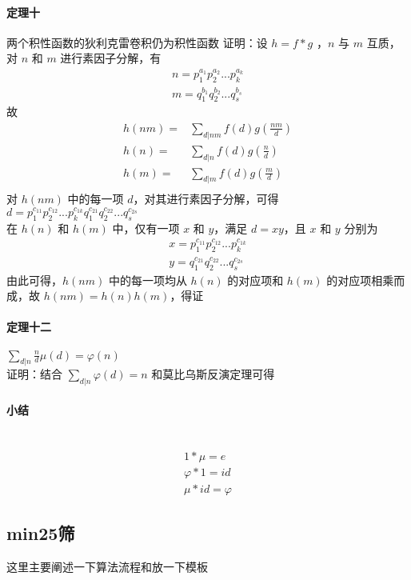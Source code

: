  	\paragraph{定理十}两个积性函数的狄利克雷卷积仍为积性函数
 	证明：设 $h = f * g$ ，$n$ 与 $m$ 互质，对 $n$ 和 $m$ 进行素因子分解，有
 	$$
 	\begin{aligned}
 	 	 n=p_1^{a_1}p_2^{a_2}...p_k^{a_k}\\m=q_1^{b_1}q_2^{b_2}...q_s^{b_s}
 	\end{aligned}
 	$$
 	故
 	$$
 	\begin{aligned}
 	h(nm)=&\sum_{d|nm}f(d)g(\frac{nm}{d})\\
 	h(n)=&\sum_{d|n}f(d)g(\frac{n}{d})\\
 	h(m)=&\sum_{d|m}f(d)g(\frac{m}{d})\\
 	\end{aligned}
 	$$
 	对 $h(nm)$ 中的每一项 $d$，对其进行素因子分解，可得 $d=p_1^{c_{11}}p_2^{c_{12}}...p_k^{c_{1k}}q_1^{c_{21}}q_2^{c_{22}}...q_s^{c_{2s}}$\\
 	在 $h(n)$ 和 $h(m)$ 中，仅有一项 $x$ 和 $y$，满足 $d=xy$，且 $x$ 和 $y$ 分别为\\
 	$$
 	\begin{aligned}
 	x=p_1^{c_{11}}p_2^{c_{12}}...p_k^{c_{1k}}\\ 
 	y=q_1^{c_{21}}q_2^{c_{22}}...q_s^{c_{2s}}
 	\end{aligned}
 	$$
 	由此可得，$h(nm)$ 中的每一项均从 $h(n)$ 的对应项和 $h(m)$ 的对应项相乘而成，故 $h(nm)=h(n)h(m)$，得证
 	\paragraph{定理十二} $\displaystyle \sum_{d|n}\frac{n}{d}\mu(d)=\varphi(n)$\\
 	证明：结合 $\sum_{d|n}\varphi(d)=n$ 和莫比乌斯反演定理可得
 	\paragraph{小结}~\\
 	$$
 	\begin{aligned}
 	1*\mu=e\\
 	\varphi *1=id\\
 	\mu *id=\varphi
 	\end{aligned}
 	$$
	\newpage
	\subsection{min25筛}
	这里主要阐述一下算法流程和放一下模板
